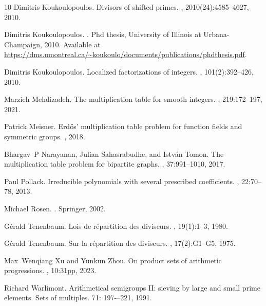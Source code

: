 \documentclass[12pt]{amsart}
\numberwithin{equation}{section}
\theoremstyle{definition}
\theoremstyle{remark}
\begin{document}
\begin{thebibliography}{10}
Dimitris Koukoulopoulos.
\newblock Divisors of shifted primes.
,
  2010(24):4585--4627, 2010.

Dimitris Koukoulopoulos.
.
\newblock Phd thesis, University of Illinois at Urbana-Champaign, 2010.
\newblock Available at
  \url{https://dms.umontreal.ca/~koukoulo/documents/publications/phdthesis.pdf}.

Dimitris Koukoulopoulos.
\newblock Localized factorizations of integers.
,
  101(2):392--426, 2010.

Marzieh Mehdizadeh.
\newblock The multiplication table for smooth integers.
, 219:172--197, 2021.

Patrick Meisner.
\newblock Erd{\H{o}}s' multiplication table problem for function fields and symmetric groups.
, 2018.

Bhargav~P Narayanan, Julian Sahasrabudhe, and Istv{\'a}n Tomon.
\newblock The multiplication table problem for bipartite graphs.
, 37:991--1010, 2017.

Paul Pollack.
\newblock Irreducible polynomials with several prescribed coefficients.
, 22:70--78, 2013.

Michael Rosen.
.
\newblock Springer, 2002.

G{\'e}rald Tenenbaum.
\newblock Lois de r{\'e}partition des diviseurs.
,
  19(1):1--3, 1980.

G{\'e}rald Tenenbaum.
\newblock Sur la r{\'e}partition des diviseurs.
,
  17(2):G1--G5, 1975.

Max~Wenqiang Xu and Yunkun Zhou.
\newblock On product sets of arithmetic progressions.
, 10:31pp, 2023.

Richard Warlimont.
\newblock Arithmetical semigroups II: sieving by large and small prime elements. Sets of multiples.
 71: 197-–221, 1991. 



\end{thebibliography}
\end{document}
